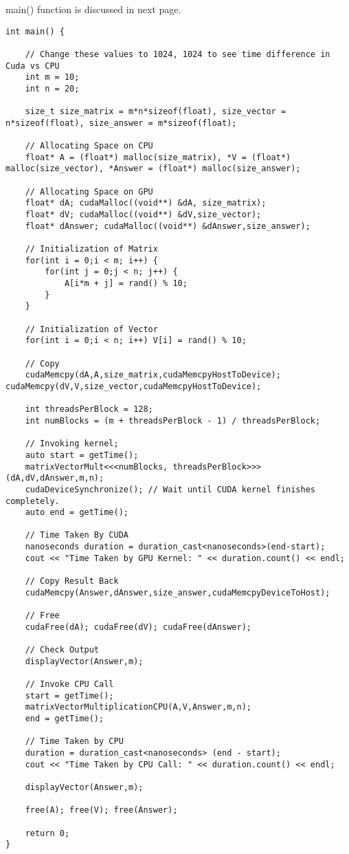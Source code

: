 main() function is discussed in next page.

\newpage

\begin{lstlisting}
int main() {

    // Change these values to 1024, 1024 to see time difference in Cuda vs CPU
    int m = 10;
    int n = 20;

    size_t size_matrix = m*n*sizeof(float), size_vector = n*sizeof(float), size_answer = m*sizeof(float);

    // Allocating Space on CPU
    float* A = (float*) malloc(size_matrix), *V = (float*) malloc(size_vector), *Answer = (float*) malloc(size_answer);

    // Allocating Space on GPU
    float* dA; cudaMalloc((void**) &dA, size_matrix);
    float* dV; cudaMalloc((void**) &dV,size_vector);
    float* dAnswer; cudaMalloc((void**) &dAnswer,size_answer);

    // Initialization of Matrix
    for(int i = 0;i < m; i++) {
        for(int j = 0;j < n; j++) {
            A[i*m + j] = rand() % 10;
        }
    }

    // Initialization of Vector
    for(int i = 0;i < n; i++) V[i] = rand() % 10;

    // Copy
    cudaMemcpy(dA,A,size_matrix,cudaMemcpyHostToDevice); cudaMemcpy(dV,V,size_vector,cudaMemcpyHostToDevice);

    int threadsPerBlock = 128;
    int numBlocks = (m + threadsPerBlock - 1) / threadsPerBlock;
    
    // Invoking kernel;
    auto start = getTime();
    matrixVectorMult<<<numBlocks, threadsPerBlock>>> (dA,dV,dAnswer,m,n);
    cudaDeviceSynchronize(); // Wait until CUDA kernel finishes completely.
    auto end = getTime();

    // Time Taken By CUDA
    nanoseconds duration = duration_cast<nanoseconds>(end-start);
    cout << "Time Taken by GPU Kernel: " << duration.count() << endl;

    // Copy Result Back
    cudaMemcpy(Answer,dAnswer,size_answer,cudaMemcpyDeviceToHost);

    // Free
    cudaFree(dA); cudaFree(dV); cudaFree(dAnswer);

    // Check Output
    displayVector(Answer,m);

    // Invoke CPU Call
    start = getTime();
    matrixVectorMultiplicationCPU(A,V,Answer,m,n);
    end = getTime();

    // Time Taken by CPU
    duration = duration_cast<nanoseconds> (end - start);
    cout << "Time Taken by CPU Call: " << duration.count() << endl;

    displayVector(Answer,m);

    free(A); free(V); free(Answer);

    return 0;
}   

\end{lstlisting}


